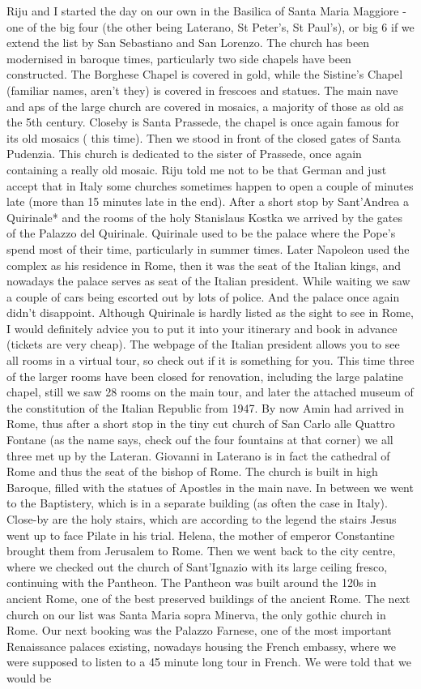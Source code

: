 Riju and I started the day on our own in the Basilica of Santa Maria Maggiore - one of the big four (the other being Laterano, St Peter's, St Paul's), or big 6 if we extend the list by San Sebastiano and San Lorenzo. The church has been modernised in baroque times, particularly two side chapels have been constructed. The Borghese Chapel is covered in gold, while the Sistine's Chapel (familiar names, aren't they) is covered in frescoes and statues. The main nave and aps of the large church are covered in mosaics, a majority of those as old as the 5th century. Closeby is Santa Prassede, the chapel is once again famous for its old mosaics ( this time). Then we stood in front of the closed gates of Santa Pudenzia. This church is dedicated to the sister of Prassede, once again containing a really old mosaic. Riju told me not to be that German and just accept that in Italy some churches sometimes happen to open a couple of minutes late (more than 15 minutes late in the end). After a short stop by Sant'Andrea a Quirinale* and the rooms of the holy Stanislaus Kostka we arrived by the gates of the Palazzo del Quirinale. Quirinale used to be the palace where the Pope's spend most of their time, particularly in summer times. Later Napoleon used the complex as his residence in Rome, then it was the seat of the Italian kings, and nowadays the palace serves as seat of the Italian president. While waiting we saw a couple of cars being escorted out by lots of police. And the palace once again didn't disappoint. Although Quirinale is hardly listed as the sight to see in Rome, I would definitely advice you to put it into your itinerary and book in advance (tickets are very cheap). The webpage of the Italian president allows you to see all rooms in a virtual tour, so check out if it is something for you. This time three of the larger rooms have been closed for renovation, including the large palatine chapel, still we saw 28 rooms on the main tour, and later the attached museum of the constitution of the Italian Republic from 1947. By now Amin had arrived in Rome, thus after a short stop in the tiny cut church of San Carlo alle Quattro Fontane (as the name says, check ouf the four fountains at that corner) we all three met up by the Lateran. Giovanni in Laterano is in fact the cathedral of Rome and thus the seat of the bishop of Rome. The church is built in high Baroque, filled with the statues of Apostles in the main nave. In between we went to the Baptistery, which is in a separate building (as often the case in Italy). Close-by are the holy stairs, which are according to the legend the stairs Jesus went up to face Pilate in his trial. Helena, the mother of emperor Constantine brought them from Jerusalem to Rome. Then we went back to the city centre, where we checked out the church of Sant'Ignazio with its large ceiling fresco, continuing with the Pantheon. The Pantheon was built around the 120s in ancient Rome, one of the best preserved buildings of the ancient Rome. The next church on our list was Santa Maria sopra Minerva, the only gothic church in Rome. Our next booking was the Palazzo Farnese, one of the most important Renaissance palaces existing, nowadays housing the French embassy, where we were supposed to listen to a 45 minute long tour in French. We were told that we would be 